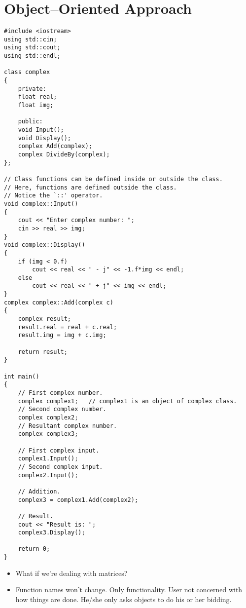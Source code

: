 \documentclass[12pt,a4paper]{article}
\begin{document}
\section{Object--Oriented Approach}
\begin{lstlisting}[caption={Object--oriented approach to add complex numbers}]
#include <iostream>
using std::cin;
using std::cout;
using std::endl;

class complex
{
	private:
	float real;
	float img;
	
	public:
	void Input();
	void Display();
	complex Add(complex);
	complex DivideBy(complex);
};

// Class functions can be defined inside or outside the class.
// Here, functions are defined outside the class.
// Notice the `::' operator.
void complex::Input()
{
	cout << "Enter complex number: ";
	cin >> real >> img;
}
void complex::Display()
{
	if (img < 0.f)
		cout << real << " - j" << -1.f*img << endl;
	else
		cout << real << " + j" << img << endl;
}
complex complex::Add(complex c)
{
	complex result;
	result.real = real + c.real;
	result.img = img + c.img;
	
	return result;
}

int main()
{
	// First complex number.
	complex complex1;	// complex1 is an object of complex class.
	// Second complex number.
	complex complex2;
	// Resultant complex number.
	complex complex3;
	
	// First complex input.
	complex1.Input();
	// Second complex input.
	complex2.Input();
	
	// Addition.
	complex3 = complex1.Add(complex2);
	
	// Result.
	cout << "Result is: ";
	complex3.Display();
	
	return 0;
}
\end{lstlisting}
\begin{itemize}
\item What if we're dealing with matrices?
\item Function names won't change. Only functionality. User not concerned with how things are done. He/she only asks objects to do his or her bidding.
\end{itemize}
\nocite{*}


\end{document}

